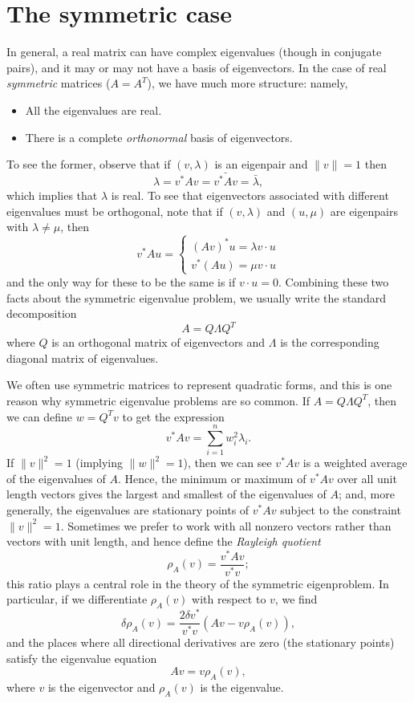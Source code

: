 \documentclass[12pt, leqno]{article}
\begin{document}
\section{The symmetric case}

In general, a real matrix can have complex eigenvalues (though in
conjugate pairs), and it may or may not have a basis of eigenvectors.
In the case of real {\em symmetric} matrices ($A = A^T$), we have
much more structure: namely,
\begin{itemize}
\item All the eigenvalues are real.
\item There is a complete {\em orthonormal} basis of eigenvectors.
\end{itemize}
To see the former, observe that if $(v, \lambda)$ is an eigenpair
and $\|v\| = 1$ then
\[
  \lambda = v^* A v = \bar{v^* A v} = \bar{\lambda},
\]
which implies that $\lambda$ is real.  To see that eigenvectors
associated with different eigenvalues must be orthogonal, note
that if $(v,\lambda)$ and $(u,\mu)$ are eigenpairs with $\lambda \neq
\mu$, then
\[
v^* A u = \begin{cases}
  (A v)^* u = \lambda v \cdot u \\
  v^* (Au) = \mu v \cdot u
\end{cases}
\]
and the only way for these to be the same is if $v \cdot u = 0$.
Combining these two facts about the symmetric eigenvalue problem,
we usually write the standard decomposition
\[
  A = Q \Lambda Q^T
\]
where $Q$ is an orthogonal matrix of eigenvectors
and $\Lambda$ is the corresponding diagonal matrix of eigenvalues.

We often use symmetric matrices to represent quadratic forms,
and this is one reason why symmetric eigenvalue problems are
so common.  If $A = Q \Lambda Q^T$, then we can define $w = Q^T v$
to get the expression
\[
  v^* A v = \sum_{i=1}^n w_i^2 \lambda_i.
\]
If $\|v\|^2 = 1$ (implying $\|w\|^2 = 1$), then we can see $v^* A v$ is a
weighted average of the eigenvalues of $A$.  Hence, the minimum or
maximum of $v^* A v$ over all unit length vectors gives the largest
and smallest of the eigenvalues of $A$; and, more generally, the
eigenvalues are stationary points of $v^* A v$ subject to the
constraint $\|v\|^2 = 1$.  Sometimes we prefer to work with all nonzero
vectors rather than vectors with unit length, and hence define the
{\em Rayleigh quotient}
\[
  \rho_A(v) = \frac{v^* A v}{v^* v};
\]
this ratio plays a central role in the theory of the symmetric eigenproblem.
In particular, if we differentiate $\rho_A(v)$ with respect to $v$,
we find
\[
  \delta \rho_A(v) =
  \frac{2 \delta v^*}{v^* v}
  \left(
    Av-v \rho_A(v)
  \right),
\]
and the places where all directional derivatives are zero (the stationary
points) satisfy the eigenvalue equation
\[
  Av = v \rho_A(v),
\]
where $v$ is the eigenvector and $\rho_A(v)$ is the eigenvalue.
\end{document}
